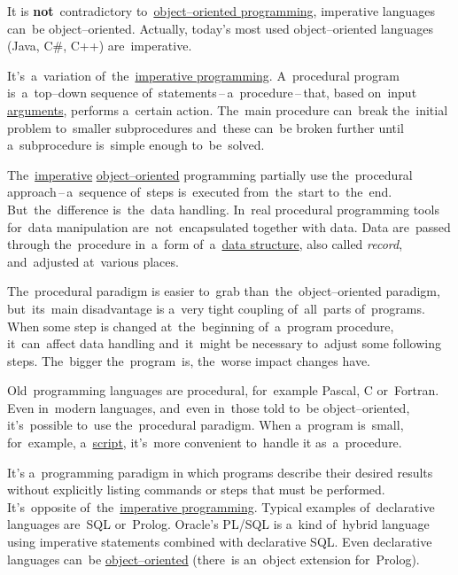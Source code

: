 \warning It is \textbf{not}~contradictory to~\hyperref[objectorientedprogramming]{object--oriented programming}, imperative languages can~be object--oriented. Actually, today's most used object--oriented languages (Java, C\#, C++) are~imperative.

It's~a~variation of~the~\hyperref[imperativeprogramming]{imperative programming}. A~procedural program is~a~top--down sequence of~statements\,--\,a~procedure\,--\,that, based on~input \hyperref[parameterargument]{arguments}, performs a~certain action. The~main procedure can~break the~initial problem to~smaller subprocedures and~these can~be broken further until a~subprocedure is~simple enough to~be~solved.

The~\hyperref[imperativeprogramming]{imperative} \hyperref[objectorientedprogramming]{object--oriented} programming partially use the~procedural approach\,--\,a~sequence of~steps is~executed from~the~start to~the~end. But~the~difference is~the~data handling. In~real procedural programming tools for~data manipulation are~not~encapsulated together with data. Data are~passed through the~procedure in~a~form of~a~\hyperref[objectdatastructure]{data structure}, also called \textit{record}, and~adjusted at~various places.

The~procedural paradigm is easier to~grab than~the~object--oriented paradigm, but~its~main disadvantage is a~very tight coupling of~all~parts of~programs. When some step is changed at~the~beginning of~a~program procedure, it~can~affect data handling and~it~might be necessary to~adjust some following steps. The~bigger the~program~is, the~worse impact changes have.

Old~programming languages are procedural, for~example Pascal, C or~Fortran. Even in~modern languages, and~even in~those told to~be object--oriented, it's~possible to~use the~procedural paradigm. When a~program is~small, for~example, a~\hyperref[scriptinglanguages]{script}, it's~more convenient to~handle it as~a~procedure.

\label{declarativeprogramming}
It's a~programming paradigm in which programs describe their desired results without explicitly listing commands or steps that must be performed. It's~opposite of~the~\hyperref[imperativeprogramming]{imperative programming}. Typical examples of~declarative languages are~SQL or~Prolog. Oracle's PL/SQL is a~kind of~hybrid language using imperative statements combined with declarative SQL. Even declarative languages can~be \hyperref[objectorientedprogramming]{object--oriented} (there~is an~object extension for~Prolog).
\newpage

